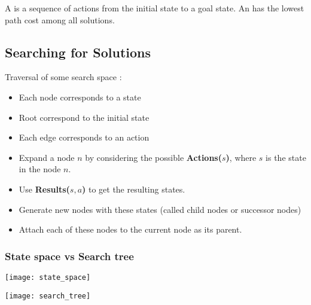 A  is a sequence of actions from the initial state to a goal state.
An  has the lowest path cost among all solutions.

\subsection{Searching for Solutions}

Traversal of some search space :
\begin{itemize}
\item Each node corresponds to a state
\item Root correspond to the initial state
\item Each edge corresponds to an action
\end{itemize}

\begin{itemize}
\item Expand a node $n$ by considering the possible \textbf{Actions($s$)}, where $s$ is the state in the node $n$.
\item Use \textbf{Results($s, a$)} to get the resulting states.
\item Generate new nodes with these states (called child nodes or successor nodes)
\item Attach each of these nodes to the current node as its parent.
\end{itemize}

\subsubsection{State space vs Search tree}

\begin{Parallel}[v]{0.48\textwidth}{0.48\textwidth}
\ParallelPar
\end{Parallel}

\begin{minipage}{0.5\textwidth}
  \centering
  \texttt{[image: state\_space]}
\end{minipage}
\begin{minipage}{0.5\textwidth}
  \centering
  \texttt{[image: search\_tree]}
\end{minipage}

